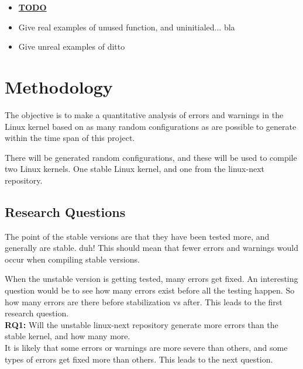 \documentclass[a4paper,11pt]{article}
\begin{document}
\begin{itemize}
    \item \underline{\textbf{TODO}}
    \item Give real examples of unused function, and uninitialed... bla
    \item Give unreal examples of ditto
\end{itemize}


\newpage
\section{Methodology}

The objective is to make a quantitative analysis of errors and warnings in the 
Linux kernel based on as many random configurations as are possible to generate 
within the time span of this project.

There will be generated random configurations, and these will be used to 
compile two Linux kernels. One stable Linux kernel, and one from the 
linux-next repository.  
\\


\subsection{Research Questions}

The point of the stable versions are that they have been tested more, and 
generally are stable. duh! This should mean that fewer errors and warnings 
would occur when compiling stable versions.

When the unstable version is getting tested, many errors get fixed.
An interesting question would be to see how many errors exist before all the 
testing happen. So how many errors are there before stabilization vs after. 
This leads to the first research question.
\\

\textbf{RQ1:} Will the unstable linux-next repository generate more errors than the 
stable kernel, and how many more. 
\\


It is likely that some errors or warnings are more severe than others, and some 
types of errors get fixed more than others. This leads to the next question.
\\
\end{document}
